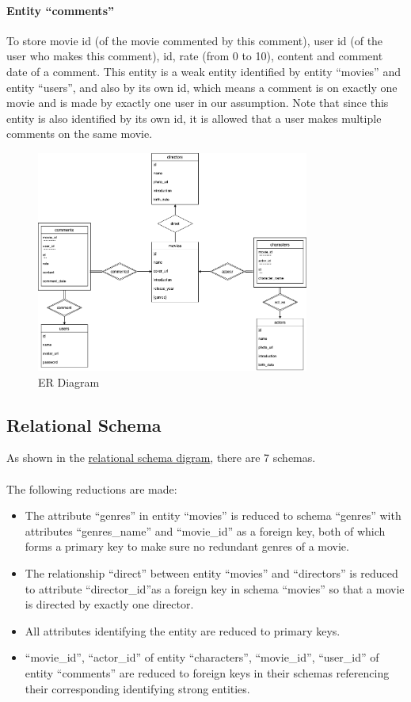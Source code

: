 \begin{CJK*}{UTF8}{gbsn}
\paragraph{Entity ``comments''}
To store movie id (of the movie commented by this comment), user id (of the user who makes this comment), id, rate (from 0 to 10), content and comment date of a comment. This entity is a weak entity identified by entity ``movies'' and entity ``users'', and also by its own id, which means a comment is on exactly one movie and is made by exactly one user in our assumption. Note that since this entity is also identified by its own id, it is allowed that a user makes multiple comments on the same movie. 

\begin{figure}[h]
\centering
\label{ERD}
\includegraphics[width=0.8\textwidth]{er.png}
\caption{ER Diagram}
\end{figure}

\subsection{Relational Schema}
As shown in the \hyperref[RelationalSchema]{relational schema digram}, there are 7 schemas. \\\\
The following reductions are made:
\begin{itemize}
\item The attribute ``genres'' in entity ``movies'' is reduced to schema ``genres'' with attributes ``genres\_name'' and ``movie\_id'' as a foreign key, both of which forms a primary key to make sure no redundant genres of a movie.
\item The relationship ``direct'' between entity ``movies'' and ``directors'' is reduced to attribute ``director\_id''as a foreign key in schema ``movies'' so that a movie is directed by exactly one director. 
\item All attributes identifying the entity are reduced to primary keys.
\item ``movie\_id'', ``actor\_id'' of entity ``characters'', ``movie\_id'', ``user\_id'' of entity ``comments'' are reduced to foreign keys in their schemas referencing their corresponding identifying strong entities. 
\end{itemize}


\end{CJK*}
